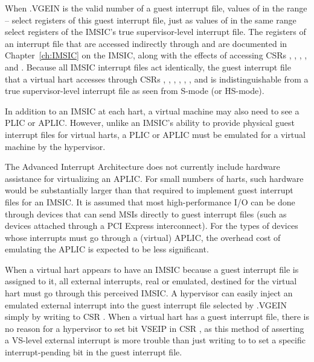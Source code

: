 When .VGEIN is the valid number of a guest interrupt
file, values of  in the range -- select
registers of this guest interrupt file, just as values of 
in the same range select registers of the IMSIC's true supervisor-level
interrupt file.
The registers of an interrupt file that are accessed indirectly through
 and  are documented in Chapter~\ref{ch:IMSIC}
on the IMSIC, along with the effects of accessing CSRs ,
, , , and .
Because all IMSIC interrupt files act identically, the guest interrupt
file that a virtual hart accesses through CSRs , ,
, , , ,
and  is indistinguishable from a true supervisor-level
interrupt file as seen from \mbox{S-mode} (or \mbox{HS-mode}).

In addition to an IMSIC at each hart, a virtual machine may also need
to see a PLIC or APLIC.
However, unlike an IMSIC's ability to provide physical guest interrupt
files for virtual harts, a PLIC or APLIC must be emulated for a virtual machine
by the hypervisor.

\begin{commentary}
The Advanced Interrupt Architecture does not currently include hardware
assistance for virtualizing an APLIC.
For small numbers of harts, such hardware would be substantially larger
than that required to implement guest interrupt files for an IMSIC.
It is assumed that most high-performance I/O can be done through
devices that can send MSIs directly to guest interrupt files (such as
devices attached through a PCI Express interconnect).
For the types of devices whose interrupts must go through a (virtual)
APLIC, the overhead cost of emulating the APLIC is expected to be less
significant.
\end{commentary}

When a virtual hart appears to have an IMSIC because a guest interrupt
file is assigned to it, all external interrupts, real or emulated,
destined for the virtual hart must go through this perceived IMSIC.
A hypervisor can easily inject an emulated external interrupt into the
guest interrupt file selected by .VGEIN simply by writing to
CSR .
When a virtual hart has a guest interrupt file, there is no reason
for a hypervisor to set bit VSEIP in CSR , as this method
of asserting a VS-level external interrupt is more trouble than just
writing to  to set a specific interrupt-pending bit in
the guest interrupt file.


